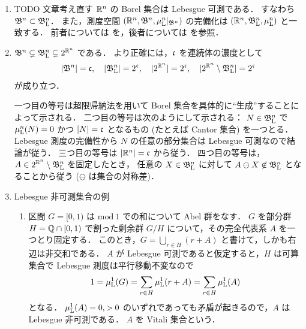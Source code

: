 \begin{remark}\label{rem:Borel_Lebesgue}
    \leavevmode
    \begin{enumerate}
        \item
            {\color{red} TODO 文章考え直す}
            $\mathbb{R}^n$ の Borel 集合は Lebesgue 可測である．
            すなわち $\mathfrak{B}^n\subset\mathfrak{B}_{\mathrm{L}}^n$．
            また，測度空間 $(\mathbb{R}^n,\mathfrak{B}^n,\mu_{\mathrm{L}}^n\vert_{\mathfrak{B}^n})$ の完備化は
            $(\mathbb{R}^n,\mathfrak{B}_{\mathrm{L}}^n,\mu_{\mathrm{L}}^n)$ と一致する．
            前者については \cite[定理 7.2]{It63} を，後者については \cite[p.49]{It63} を参照．

        \item
            $\mathfrak{B}^n\subsetneq\mathfrak{B}_{\mathrm{L}}^n\subsetneq2^{\mathbb{R}^n}$ である．
            より正確には，$\mathfrak{c}$ を連続体の濃度として
            \begin{align}
                |\mathfrak{B}^n|=\mathfrak{c},\quad
                |\mathfrak{B}_{\mathrm{L}}^n|=2^{\mathfrak{c}},\quad
                |2^{\mathbb{R}^n}|=2^{\mathfrak{c}},\quad
                |2^{\mathbb{R}^n}\setminus\mathfrak{B}_{\mathrm{L}}^n|=2^{\mathfrak{c}}
            \end{align}
            が成り立つ．

            一つ目の等号は超限帰納法を用いて Borel 集合を具体的に``生成''することによって示される\cite{ms70880}．
            二つ目の等号は次のようにして示される：
            $N\in\mathfrak{B}_{\mathrm{L}}^n$ で $\mu_{\mathrm{L}}^n(N)=0$ かつ $|N|=\mathfrak{c}$ となるもの (たとえば Cantor 集合) を一つとる．
            Lebesgue 測度の完備性から $N$ の任意の部分集合は Lebesgue 可測なので結論が従う．
            三つ目の等号は $|\mathbb{R}^n|=\mathfrak{c}$ から従う．
            四つ目の等号は，$A\in2^{\mathbb{R}^n}\setminus\mathfrak{B}_{\mathrm{L}}^n$ を固定したとき，
            任意の $X\in\mathfrak{B}_{\mathrm{L}}^n$ に対して $A\ominus X\not\in\mathfrak{B}_{\mathrm{L}}^n$ となることから従う ($\ominus$ は集合の対称差)．

        \item Lebesgue 非可測集合の例
            \begin{enumerate}
                \item
                    区間 $G=[0,1)$ は $\mathrm{mod}\ 1$ での和について Abel 群をなす．
                    $G$ を部分群 $H=\mathbb{Q}\cap[0,1)$ で割った剰余群 $G/H$ について，その完全代表系 $A$ を一つとり固定する．
                    このとき，$G=\bigcup_{r\in H}(r+A)$ と書けて，しかも右辺は非交和である．
                    $A$ が Lebesgue 可測であると仮定すると，$H$ は可算集合で Lebesgue 測度は平行移動不変なので
                    \begin{align*}
                        1
                        =\mu_{\mathrm{L}}^1(G)
                        =\sum_{r\in H}\mu_{\mathrm{L}}^1(r+A)
                        =\sum_{r\in H}\mu_{\mathrm{L}}^1(A)
                    \end{align*}
                    となる．
                    $\mu_{\mathrm{L}}^1(A)=0,>0$ のいずれであっても矛盾が起きるので，$A$ は Lebesgue 非可測である．
                    $A$ を Vitali 集合という．


\end{enumerate}
\end{enumerate}
\end{remark}
